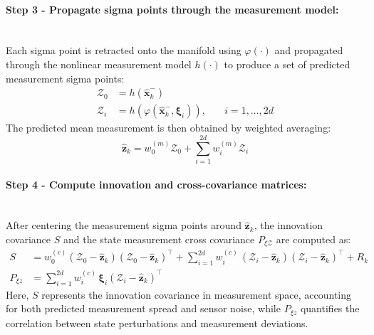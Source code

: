 \paragraph{Step 3 - Propagate sigma points through the measurement model:} \mbox{}\\[0.5em] \noindent
Each sigma point is retracted onto the manifold using $\varphi(\cdot)$ and propagated through the nonlinear measurement model $h(\cdot)$ to produce a set of predicted measurement sigma points:
$$
    \begin{aligned}
        \mathcal{Z}_0 &= h(\hat{\mathbf{x}}_{k}^{-}) \\
        \mathcal{Z}_i &= h\!\left(\varphi(\hat{\mathbf{x}}_{k}^{-}, \boldsymbol{\xi}_i)\right), \quad &i = 1,\ldots,2d
    \end{aligned}
$$
The predicted mean measurement is then obtained by weighted averaging:
$$
    \hat{\mathbf{z}}_k = w_0^{(m)}\mathcal{Z}_0 + \sum_{i=1}^{2d} w_i^{(m)}\mathcal{Z}_i
$$

\paragraph{Step 4 - Compute innovation and cross-covariance matrices:} \mbox{}\\[0.5em] \noindent
After centering the measurement sigma points around $\hat{\mathbf{z}}_k$, the innovation covariance $S$ and the state measurement cross covariance $P_{\xi \mathcal{Z}}$ are computed as:
$$
    \begin{aligned}
        S &= w_0^{(c)}(\mathcal{Z}_0 - \hat{\mathbf{z}}_k)(\mathcal{Z}_0 - \hat{\mathbf{z}}_k)^\top + \sum_{i=1}^{2d} w_i^{(c)} \,(\mathcal{Z}_i - \hat{\mathbf{z}}_k)(\mathcal{Z}_i - \hat{\mathbf{z}}_k)^\top + R_k \\
        P_{\xi z} &= \sum_{i=1}^{2d} w_i^{(c)} \, \boldsymbol{\xi}_i (\mathcal{Z}_i - \hat{\mathbf{z}}_k)^\top
    \end{aligned}
$$
Here, $S$ represents the innovation covariance in measurement space, accounting for both predicted measurement spread and sensor noise, while $P_{\xi z}$ quantifies the correlation between state perturbations and measurement deviations.

